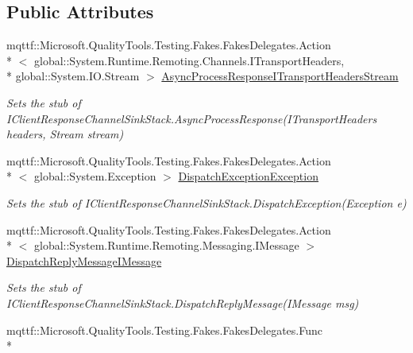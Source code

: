 \subsection*{Public Attributes}
\begin{DoxyCompactItemize}
\item 
mqttf\-::\-Microsoft.\-Quality\-Tools.\-Testing.\-Fakes.\-Fakes\-Delegates.\-Action\\*
$<$ global\-::\-System.\-Runtime.\-Remoting.\-Channels.\-I\-Transport\-Headers, \\*
global\-::\-System.\-I\-O.\-Stream $>$ \hyperlink{class_system_1_1_runtime_1_1_remoting_1_1_channels_1_1_fakes_1_1_stub_i_client_channel_sink_stack_a260e09d71f6cb9fe18e4d3cddecf14cb}{Async\-Process\-Response\-I\-Transport\-Headers\-Stream}
\begin{DoxyCompactList}\small\item\em Sets the stub of I\-Client\-Response\-Channel\-Sink\-Stack.\-Async\-Process\-Response(\-I\-Transport\-Headers headers, Stream stream)\end{DoxyCompactList}\item 
mqttf\-::\-Microsoft.\-Quality\-Tools.\-Testing.\-Fakes.\-Fakes\-Delegates.\-Action\\*
$<$ global\-::\-System.\-Exception $>$ \hyperlink{class_system_1_1_runtime_1_1_remoting_1_1_channels_1_1_fakes_1_1_stub_i_client_channel_sink_stack_adc732ccc28a530decf48167548763c6a}{Dispatch\-Exception\-Exception}
\begin{DoxyCompactList}\small\item\em Sets the stub of I\-Client\-Response\-Channel\-Sink\-Stack.\-Dispatch\-Exception(\-Exception e)\end{DoxyCompactList}\item 
mqttf\-::\-Microsoft.\-Quality\-Tools.\-Testing.\-Fakes.\-Fakes\-Delegates.\-Action\\*
$<$ global\-::\-System.\-Runtime.\-Remoting.\-Messaging.\-I\-Message $>$ \hyperlink{class_system_1_1_runtime_1_1_remoting_1_1_channels_1_1_fakes_1_1_stub_i_client_channel_sink_stack_af1cf8881a2384ff66b2e63b79a31bfed}{Dispatch\-Reply\-Message\-I\-Message}
\begin{DoxyCompactList}\small\item\em Sets the stub of I\-Client\-Response\-Channel\-Sink\-Stack.\-Dispatch\-Reply\-Message(\-I\-Message msg)\end{DoxyCompactList}\item 
mqttf\-::\-Microsoft.\-Quality\-Tools.\-Testing.\-Fakes.\-Fakes\-Delegates.\-Func\\*

\end{DoxyCompactItemize}
